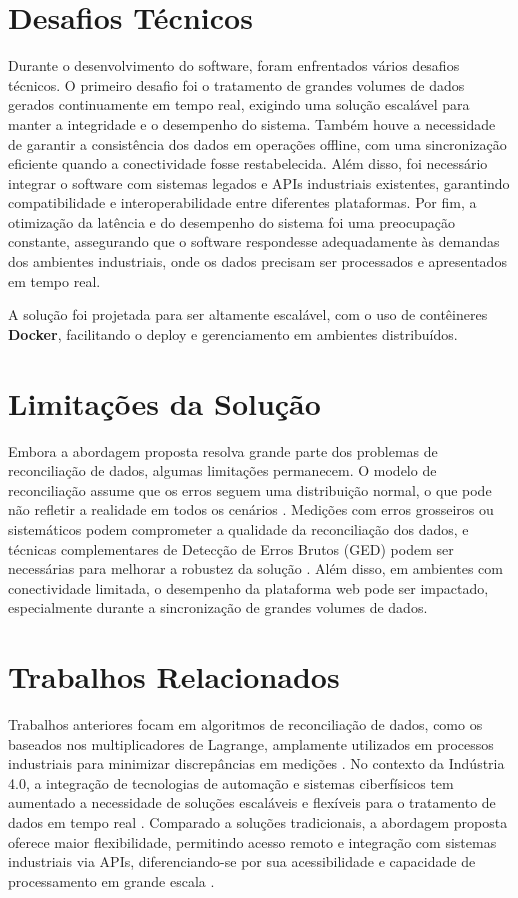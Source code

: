 \section{Desafios Técnicos}
\label{Sec:DesafiosTecnicos}

Durante o desenvolvimento do software, foram enfrentados vários desafios técnicos. O primeiro desafio foi o tratamento de grandes volumes de dados gerados continuamente em tempo real, exigindo uma solução escalável para manter a integridade e o desempenho do sistema. Também houve a necessidade de garantir a consistência dos dados em operações offline, com uma sincronização eficiente quando a conectividade fosse restabelecida. Além disso, foi necessário integrar o software com sistemas legados e APIs industriais existentes, garantindo compatibilidade e interoperabilidade entre diferentes plataformas. Por fim, a otimização da latência e do desempenho do sistema foi uma preocupação constante, assegurando que o software respondesse adequadamente às demandas dos ambientes industriais, onde os dados precisam ser processados e apresentados em tempo real.

A solução foi projetada para ser altamente escalável, com o uso de contêineres \textbf{Docker}, facilitando o deploy e gerenciamento em ambientes distribuídos.

\section{Limitações da Solução}
\label{Sec:LimitacoesSolucao}

Embora a abordagem proposta resolva grande parte dos problemas de reconciliação de dados, algumas limitações permanecem. O modelo de reconciliação assume que os erros seguem uma distribuição normal, o que pode não refletir a realidade em todos os cenários \cite{datadistributionissue}. Medições com erros grosseiros ou sistemáticos podem comprometer a qualidade da reconciliação dos dados, e técnicas complementares de Detecção de Erros Brutos (GED) podem ser necessárias para melhorar a robustez da solução \cite{gedtechniques}. Além disso, em ambientes com conectividade limitada, o desempenho da plataforma web pode ser impactado, especialmente durante a sincronização de grandes volumes de dados.

\section{Trabalhos Relacionados}
\label{Sec:TrabalhosRelacionados}

Trabalhos anteriores focam em algoritmos de reconciliação de dados, como os baseados nos multiplicadores de Lagrange, amplamente utilizados em processos industriais para minimizar discrepâncias em medições \cite{reconciliationlagrange}. No contexto da Indústria 4.0, a integração de tecnologias de automação e sistemas ciberfísicos tem aumentado a necessidade de soluções escaláveis e flexíveis para o tratamento de dados em tempo real \cite{realtimeprocessingindustry4}. Comparado a soluções tradicionais, a abordagem proposta oferece maior flexibilidade, permitindo acesso remoto e integração com sistemas industriais via APIs, diferenciando-se por sua acessibilidade e capacidade de processamento em grande escala \cite{webbasedsolutions}.
